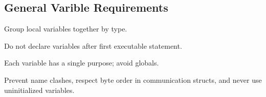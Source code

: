 \subsection{General Varible Requirements}

Group local variables together by type.

Do not declare variables after first executable statement.

Each variable has a single purpose; avoid globals.

Prevent name clashes, respect byte order in communication structs, and never use uninitialized variables.